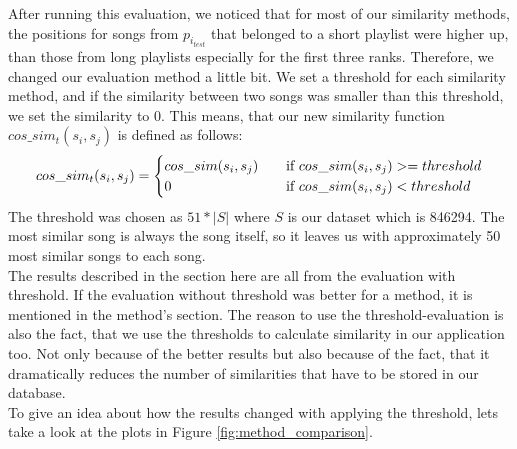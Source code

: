 \begin{itemize}
After running this evaluation, we noticed that for most of our similarity methods, the positions for songs from $p_{i_{test}} $ that belonged to a short playlist were higher up, than those from long playlists especially for the first three ranks. Therefore, we changed our evaluation method a little bit. We set a threshold for each similarity method, and if the similarity between two songs was smaller than this threshold, we set the similarity to 0. This means, that our new similarity function $cos\_sim_t(s_i,s_j)$ is defined as follows: \[   
cos\_sim_t(s_i,s_j) = 
     \begin{cases}
       \text{$ cos\_sim(s_i,s_j) $} &\quad\text{if $ cos\_sim(s_i,s_j)  >= threshold$}\\
       \text{$ 0 $} &\quad\text{if $ cos\_sim(s_i,s_j)  < threshold$}\\
     \end{cases}
\]
 The threshold was chosen as $ 51 * |S| $ where $ S $ is our dataset which is 846294. The most similar song is always the song itself, so it leaves us with approximately 50 most similar songs to each song. \\
The results described in the section here are all from the evaluation with threshold. If the evaluation without threshold was better for a method, it is mentioned in the method's section. The reason to use the threshold-evaluation is also the fact, that we use the thresholds to calculate similarity in our application too. Not only because of the better results but also because of the fact, that it dramatically reduces the number of similarities that have to be stored in our database.\\
To give an idea about how the results changed with applying the threshold, lets take a look at the plots in Figure \ref{fig:method_comparison}. 


\end{itemize}
